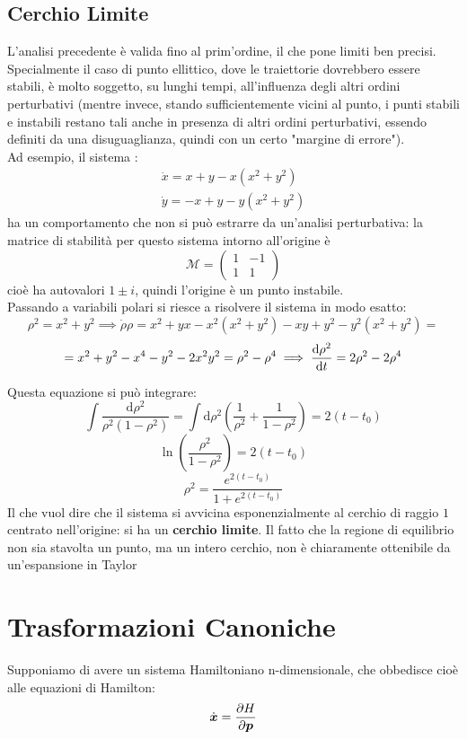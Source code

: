 \documentclass[a4paper,12pt]{article}
\theoremstyle{plain}
\renewcommand{\vec}[1]{{\boldsymbol{#1}}}
\theoremstyle{definition}
\newcommand{\Op}[1]{\mathcal{#1}}
\newcommand{\f}[2]{\frac{#1}{#2}}
\renewcommand{\d}{\text{d}}
\newcommand{\mom}{\vec{p}}
\theoremstyle{remark}
\begin{document}
\subsection{Cerchio Limite}
\label{limit}
L'analisi precedente è valida fino al prim'ordine, il che pone limiti ben precisi. \\Specialmente il caso di punto ellittico, dove le traiettorie dovrebbero essere stabili, è molto soggetto, su lunghi tempi, all'influenza degli altri ordini perturbativi (mentre invece, stando sufficientemente vicini al punto, i punti stabili e instabili restano tali anche in presenza di altri ordini perturbativi, essendo definiti da una disuguaglianza, quindi con un certo "margine di errore").
\\Ad esempio, il sistema :
\begin{align}
\dot{x}=x+y-x(x^2+y^2)
\\\dot{y}=-x+y-y(x^2+y^2)
\end{align}
ha un comportamento che non si può estrarre da un'analisi perturbativa: la matrice di stabilità per questo sistema intorno all'origine è
\[\Op{M}=\begin{pmatrix}
1 &-1\\ 
1 & 1
\end{pmatrix} \]
cioè ha autovalori $1\pm i$, quindi l'origine è un punto instabile. \\Passando a variabili polari si riesce a risolvere il sistema in modo esatto:
\[\rho^2=x^2+y^2\implies\dot{\rho} \rho=x^2+yx-x^2(x^2+y^2)-xy+y^2-y^2(x^2+y^2)=			\]
\[=x^2+y^2-x^4-y^2-2x^2y^2=\rho^2-\rho^4	\implies \dv{\rho^2}{t}=2\rho^2-2\rho^4		\]

Questa equazione si può integrare:
\[\int\f{\d \rho^2}{\rho^2(1-\rho^2)}=\int\d \rho^2\left(\f{1}{\rho^2}+\f{1}{1-\rho^2}\right)=2(t-t_0)			\]
\[\ln(\f{\rho^2}{1-\rho^2})=2(t-t_0)\]
\[\rho^2=\f{e^{2(t-t_0)}}{1+e^{2(t-t_0)}}		\]
Il che vuol dire che il sistema si avvicina esponenzialmente al cerchio di raggio $1$ centrato nell'origine: si ha un \textbf{cerchio limite}. Il fatto che la regione di equilibrio non sia stavolta un punto, ma un intero cerchio, non è chiaramente ottenibile da un'espansione in Taylor
\section{Trasformazioni Canoniche}

Supponiamo di avere un sistema Hamiltoniano n-dimensionale, che obbedisce cioè alle equazioni di Hamilton:
\[\dot{\vec{x}}=\pdv{H}{\mom}			\]
\end{document}
